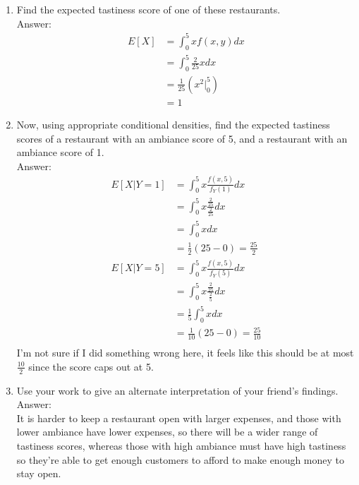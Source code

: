 \documentclass{article}
\begin{document}
\begin{enumerate}
\begin{enumerate}
                \begin{align*}
                    f_X(x) &= \frac{2}{25} \int_{5-x}^{5}dy = \frac{2}{25}x \\
                    f_Y(y) &= \frac{2}{25} \int_{5-y}^{5}dx = \frac{2}{25}y
                \end{align*}
            \item   Find the expected tastiness score of one of these restaurants.
                \\Answer:
                \begin{align*}
                    E[X] &= \int_{0}^{5}xf(x,y)dx \\ 
                         &= \int_{0}^{5}\frac{2}{25}xdx\\
                         &= \frac{1}{25}\left(x^2 \Big|^{5}_{0}\right) \\
                         &= 1
                \end{align*}
            \clearpage
            \item   Now, using appropriate conditional densities, find the expected tastiness scores of a restaurant with an
                    ambiance score of 5, and a restaurant with an ambiance score of 1.
                \\Answer:
                \begin{align*}
                    E[X|Y=1] &= \int_{0}^{5} x \frac{f(x,5)}{f_Y(1)}dx \\
                             &= \int_{0}^{5} x \frac{\frac{2}{25}}{\frac{2}{25}}dx \\
                             &= \int_{0}^{5} x dx \\
                             &= \frac{1}{2}(25-0) = \frac{25}{2} \\
                    E[X|Y=5] &= \int_{0}^{5} x \frac{f(x,5)}{f_Y(5)}dx \\
                             &= \int_{0}^{5} x \frac{\frac{2}{25}}{\frac{2}{5}}dx \\
                             &= \frac{1}{5}\int_{0}^{5} x dx \\
                             &= \frac{1}{10}(25-0) = \frac{25}{10} \\
                \end{align*}
                I'm not sure if I did something wrong here, it feels like this should be at most $\frac{10}{2}$ since the
                score caps out at 5.
            \item   Use your work to give an alternate interpretation of your friend's findings.
                \\Answer:\\
                It is harder to keep a restaurant open with larger expenses, and those with lower ambiance have lower expenses,
                so there will be a wider range of tastiness scores, whereas those with high ambiance must have high tastiness
                so they're able to get enough customers to afford to make enough money to stay open.
        \end{enumerate}
\end{enumerate}
\end{document}
